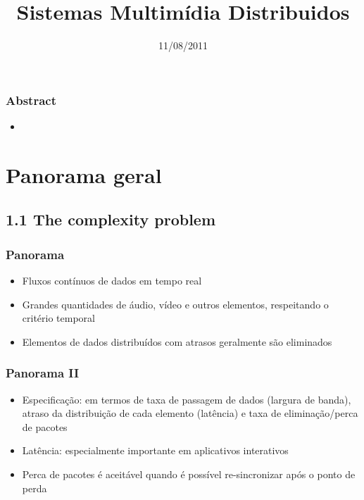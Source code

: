 \documentclass[]{beamer}
\title{Sistemas Multimídia Distribuidos}
\author{}
\institute{}
\date{11/08/2011}
\begin{document}
\begin{frame}
  \titlepage
\end{frame}



\begin{frame}
 \frametitle{Abstract}
 \begin{itemize}
   \item 
 \end{itemize}
\end{frame}

\section{Panorama geral}

\subsection{1.1 The complexity problem}

\begin{frame}
 \frametitle{Panorama}
 \begin{itemize}
   \item Fluxos contínuos de dados em tempo real
   \item Grandes quantidades de áudio, vídeo e outros elementos, respeitando o critério temporal
   \item Elementos de dados distribuídos com atrasos geralmente são eliminados
 \end{itemize}
\end{frame}

\begin{frame}
 \frametitle{Panorama II}
 \begin{itemize}
  \item Especificação: em termos de taxa de passagem de dados (largura de banda),
atraso da distribuição de cada elemento (latência) e taxa de eliminação/perca de pacotes
  \item Latência: especialmente importante em aplicativos interativos
  \item Perca de pacotes é aceitável quando é possível re-sincronizar após o ponto de perda
\end{itemize}
\end{frame}
\end{document}
